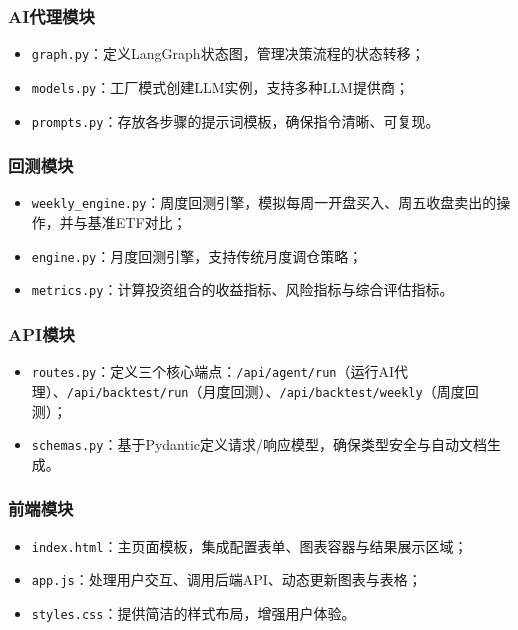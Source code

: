 \documentclass[12pt,a4paper]{ctexart}
\begin{document}
\subsubsection{AI代理模块}

\begin{itemize}
    \item \texttt{graph.py}：定义LangGraph状态图，管理决策流程的状态转移；
    \item \texttt{models.py}：工厂模式创建LLM实例，支持多种LLM提供商；
    \item \texttt{prompts.py}：存放各步骤的提示词模板，确保指令清晰、可复现。
\end{itemize}

\subsubsection{回测模块}

\begin{itemize}
    \item \texttt{weekly\_engine.py}：周度回测引擎，模拟每周一开盘买入、周五收盘卖出的操作，并与基准ETF对比；
    \item \texttt{engine.py}：月度回测引擎，支持传统月度调仓策略；
    \item \texttt{metrics.py}：计算投资组合的收益指标、风险指标与综合评估指标。
\end{itemize}

\subsubsection{API模块}

\begin{itemize}
    \item \texttt{routes.py}：定义三个核心端点：\texttt{/api/agent/run}（运行AI代理）、\texttt{/api/backtest/run}（月度回测）、\texttt{/api/backtest/weekly}（周度回测）；
    \item \texttt{schemas.py}：基于Pydantic定义请求/响应模型，确保类型安全与自动文档生成。
\end{itemize}

\subsubsection{前端模块}

\begin{itemize}
    \item \texttt{index.html}：主页面模板，集成配置表单、图表容器与结果展示区域；
    \item \texttt{app.js}：处理用户交互、调用后端API、动态更新图表与表格；
    \item \texttt{styles.css}：提供简洁的样式布局，增强用户体验。
\end{itemize}
\end{document}
